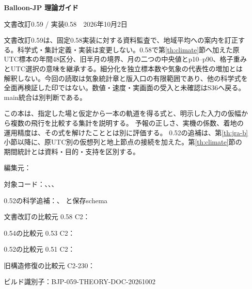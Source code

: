 \documentclass[11pt,a4paper]{article}
\newcommand{\GuideBuildID}{BJP-059-THEORY-DOC-20261002}
\begin{document}
\begin{titlepage}
\vspace*{18mm}{\color{accent}\rule{\linewidth}{1.2pt}}\par\vspace{10mm}
{\fontsize{27}{36}\selectfont\bfseries\color{ink}Balloon-JP 理論ガイド\par}
\vspace{8mm}{\Large 一飛行の式から、条件を比べる標本集合へ}\par
\vspace{12mm}文書改訂0.59 / 実装0.58　2026年10月2日\par
[更新:0.59.0] [確認:0.59.0]\par
{\small 文書改訂0.59は、固定0.58実装に対する資料監査で、地域平均への案内を訂正する。科学式・集計定義・実装は変更しない。0.58で第\ref{th:climate}節へ加えた原UTC標本の年間48区分、旧半月の境界、月の二つの中央値とp10--p90、格子重みとUTC選択の意味を継承する。細分化を独立標本数や気象の代表性の増加とは解釈しない。今回の読取は気象統計章と版入口の有限範囲であり、他の科学式を全面再検証した印ではない。数値・速度・実画面の受入と未確認はS36へ戻る。main統合は別判断である。}\par
\vfill
この本は、指定した場と仮定から一本の軌道を得る式と、明示した入力の仮幅から複数の飛行を比較する集計を説明する。
予報の正しさ、実機の係数、着地の運用精度は、その式を解けたこととは別に評価する。
0.52の追補は、第\ref{th:jra-b}小節以降に、原UTC別の仮想列と地上節点の接続を加えた。第\ref{th:climate}節の期間統計とは資料・目的・支持を区別する。
\par\vspace{5mm}
編集元：\par
対象コード：、、、\par
0.52の科学追補：、 と保存schema\par
文書改訂の比較元 0.58 C2：\par
0.54の比較元 0.53 C2：\par
0.52の比較元 0.51 C2：\par
旧構造修復の比較元 C2-230：\par
ビルド識別子：\GuideBuildID
\end{titlepage}
{\small\setlength{\parskip}{0pt}\tableofcontents}\clearpage
\end{document}
